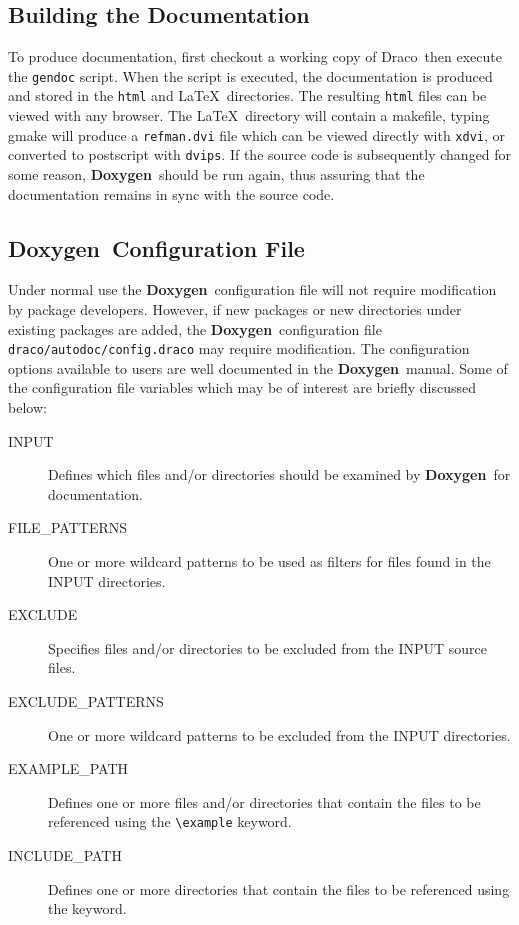 \documentclass[11pt]{nmemo}
\newcommand{\draco}{{\normalfont\sffamily Draco}}
\newcommand{\doxy}{{\normalfont\bfseries Doxygen}}
\begin{document}
\subsection{Building the Documentation}

To produce documentation, first checkout a working copy of \draco\, then
execute the \texttt{gendoc} script.
When the script is executed, 
the documentation is produced and stored in the
\texttt{html} and \LaTeX\ directories.
The resulting \texttt{html} files can be viewed with any browser. The \LaTeX\
directory will contain a makefile, typing gmake will produce 
a \texttt{refman.dvi} file which can be viewed directly with \texttt{xdvi},
or converted to postscript with \texttt{dvips}.
If the source code is subsequently changed for some reason,
\doxy\ should be run again, thus assuring that the documentation 
remains in sync with the source code.

\subsection{\doxy\ Configuration File}
\label{sec:config}

Under normal use the \doxy\ configuration file will not require
modification by package developers. However, if new packages or
new directories under existing packages are added,
the \doxy\ configuration file \texttt{draco/autodoc/config.draco}
may require modification.
The configuration options available to users are well
documented in the \doxy\ manual. Some of the configuration file 
variables which may be of interest are briefly discussed below:
\begin{description}
\item[\ttfamily INPUT] Defines which files and/or
  directories should be  examined by \doxy\ for documentation.  
\item [\ttfamily FILE\_PATTERNS] One or more wildcard patterns to be
  used as filters for files found in the INPUT directories. 
\item [\ttfamily EXCLUDE] Specifies files and/or directories to be
   excluded from the INPUT source files.
\item [\ttfamily EXCLUDE\_PATTERNS] One or more wildcard patterns to be
  excluded from the INPUT directories.
\item [\ttfamily EXAMPLE\_PATH] Defines one or more files and/or
  directories that contain the files to be referenced using
  the \verb+\example+ keyword.
\item [\ttfamily INCLUDE\_PATH] Defines one or more 
  directories that contain the files to be referenced using the
 \verb++ keyword.
\end{description}
\end{document}
